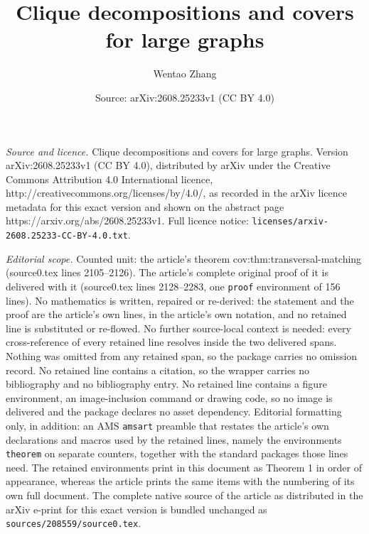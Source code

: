 \documentclass[10pt,a4paper]{amsart}
\title{Clique decompositions and covers for large graphs}
\author{Wentao Zhang}
\date{Source: arXiv:2608.25233v1 (CC BY 4.0)}
\begin{document}
\maketitle

\noindent\emph{Source and licence.} Clique decompositions and covers for large graphs. Version arXiv:2608.25233v1 (CC BY 4.0), distributed by arXiv under the Creative Commons Attribution 4.0 International licence, http://creativecommons.org/licenses/by/4.0/, as recorded in the arXiv licence metadata for this exact version and shown on the abstract page https://arxiv.org/abs/2608.25233v1. Full licence notice: \texttt{licenses/arxiv-2608.25233-CC-BY-4.0.txt}.\par\smallskip

\noindent\textit{Editorial scope.} Counted unit: the article's theorem cov:thm:transversal-matching (source0.tex lines 2105--2126). The article's complete original proof of it is delivered with it (source0.tex lines 2128--2283, one \texttt{proof} environment of 156 lines). No mathematics is written, repaired or re-derived: the statement and the proof are the article's own lines, in the article's own notation, and no retained line is substituted or re-flowed.  No further source-local context is needed: every cross-reference of every retained line resolves inside the two delivered spans.  Nothing was omitted from any retained span, so the package carries no omission record.  No retained line contains a citation, so the wrapper carries no bibliography and no bibliography entry.  No retained line contains a figure environment, an image-inclusion command or drawing code, so no image is delivered and the package declares no asset dependency.  Editorial formatting only, in addition: an AMS \texttt{amsart} preamble that restates the article's own declarations and macros used by the retained lines, namely the environments \texttt{theorem} on separate counters, together with the standard packages those lines need.  The retained environments print in this document as Theorem 1 in order of appearance, whereas the article prints the same items with the numbering of its own full document.  The complete native source of the article as distributed in the arXiv e-print for this exact version is bundled unchanged as \texttt{sources/208559/source0.tex}.
\end{document}
